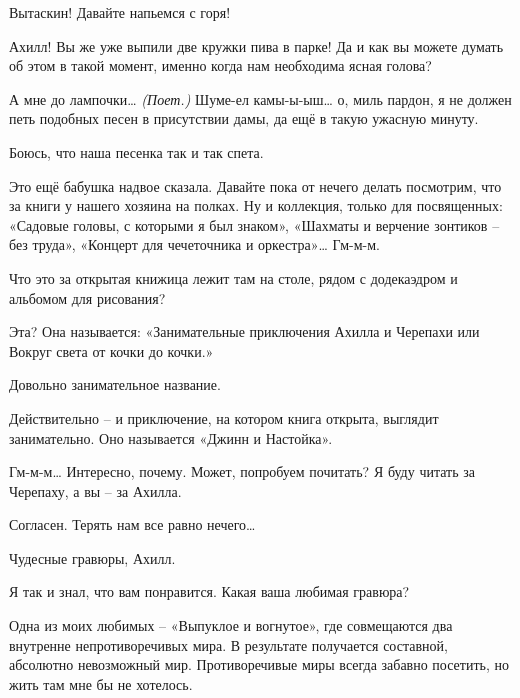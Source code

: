 \documentclass[../main.tex]{subfiles}
\begin{document}
\begin{Dialogue}
 Вытаскин! Давайте напьемся с горя!

 Ахилл! Вы же уже выпили две кружки пива в парке! Да и как вы можете думать об этом в такой момент, именно когда нам необходима ясная голова?

 А мне до лампочки\ldots{} \emph{(Поет.)} Шуме-ел камы-ы-ыш\ldots{} о, миль пардон, я не должен петь подобных песен в присутствии дамы, да ещё в такую ужасную минуту.

 Боюсь, что наша песенка так и так спета.

 Это ещё бабушка надвое сказала. Давайте пока от нечего делать посмотрим, что за книги у нашего хозяина на полках. Ну и коллекция, только для посвященных: «Садовые головы, с которыми я был знаком», «Шахматы и верчение зонтиков \--- без труда», «Концерт для чечеточника и оркестра»\ldots{} Гм-м-м.

 Что это за открытая книжица лежит там на столе, рядом с додекаэдром и альбомом для рисования?

 Эта? Она называется: «Занимательные приключения Ахилла и Черепахи или Вокруг света от кочки до кочки.»

 Довольно занимательное название.

 Действительно \--- и приключение, на котором книга открыта, выглядит занимательно. Оно называется «Джинн и Настойка».

 Гм-м-м\ldots{} Интересно, почему. Может, попробуем почитать? Я буду читать за Черепаху, а вы \--- за Ахилла.

 Согласен. Терять нам все равно нечего\ldots{}



\begin{sublevel}



 Чудесные гравюры, Ахилл.

 Я так и знал, что вам понравится. Какая ваша любимая гравюра?

 Одна из моих любимых \--- «Выпуклое и вогнутое», где совмещаются два внутренне непротиворечивых мира. В результате получается составной, абсолютно невозможный мир. Противоречивые миры всегда забавно посетить, но жить там мне бы не хотелось.


\end{sublevel}
\end{Dialogue}
\end{document}
